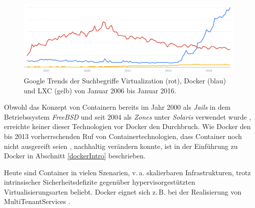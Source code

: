 \documentclass[../main.tex]{subfiles}
\begin{document}
  \begin{figure}[h]
      \centering
      \includegraphics[width=1.0\textwidth]{./images/googletrend_dockerVirtualizationLXC.png}
      \caption{Google Trends der Suchbegriffe \glqq{}Virtualization\grqq{} (rot), \glqq{}Docker\grqq{} (blau) und \glqq{}\acrshort{LXC}\grqq{} (gelb) von Januar 2006 bis Januar 2016\cite{googleTrends}.}
      \label{fig:overview_googleTrends}
  \end{figure}

  Obwohl das Konzept von Containern bereits im Jahr 2000 als \emph{Jails} in dem Betriebssystem \emph{Free\acrshort{BSD}} und seit 2004 als \emph{Zones} unter \emph{Solaris} verwendet wurde \cite{zonesReleasenotes}\cite{jailsReleasenotes}, erreichte keiner dieser Technologien vor Docker den Durchbruch. Wie Docker den bis 2013 vorherrschenden Ruf von Containertechnologien, dass Container noch nicht ausgereift seien \cite[S.8]{containerVirtPerformance}, nachhaltig verändern konnte, ist in der Einführung zu Docker in Abschnitt \ref{dockerIntro} beschrieben.

  Heute sind Container in vielen Szenarien, v.\,a. skalierbaren Infrastrukturen, trotz intrinsischer Sicherheitsdefizite gegenüber hypervisorgestützten Virtualisierungsarten beliebt. Docker eignet sich z.\,B. bei der Realisierung von \glspl{MultiTenantService} \cite[S.6]{dockerBook}\cite{dockerUnderstandingDocker}.

\end{document}
